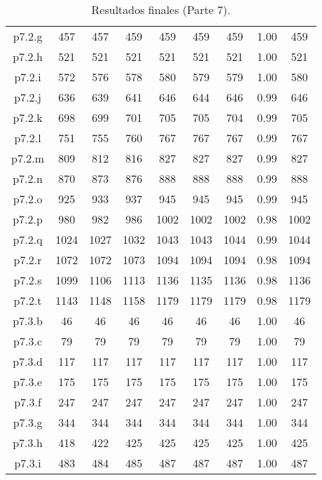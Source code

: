 \begin{table}
\begin{center}
\begin{tabular}{ |c|c|c|c|c|c|c|c|c| }
p7.2.g & 457 & 457 & 459 & 459 & 459 & 459 & 1.00 & 459  \\
p7.2.h & 521 & 521 & 521 & 521 & 521 & 521 & 1.00 & 521  \\
p7.2.i & 572 & 576 & 578 & 580 & 579 & 579 & 1.00 & 580  \\
p7.2.j & 636 & 639 & 641 & 646 & 644 & 646 & 0.99 & 646  \\
p7.2.k & 698 & 699 & 701 & 705 & 705 & 704 & 0.99 & 705  \\
p7.2.l & 751 & 755 & 760 & 767 & 767 & 767 & 0.99 & 767  \\
p7.2.m & 809 & 812 & 816 & 827 & 827 & 827 & 0.99 & 827  \\
p7.2.n & 870 & 873 & 876 & 888 & 888 & 888 & 0.99 & 888  \\
p7.2.o & 925 & 933 & 937 & 945 & 945 & 945 & 0.99 & 945  \\
p7.2.p & 980 & 982 & 986 & 1002 & 1002 & 1002 & 0.98 & 1002  \\
p7.2.q & 1024 & 1027 & 1032 & 1043 & 1043 & 1044 & 0.99 & 1044  \\
p7.2.r & 1072 & 1072 & 1073 & 1094 & 1094 & 1094 & 0.98 & 1094  \\
p7.2.s & 1099 & 1106 & 1113 & 1136 & 1135 & 1136 & 0.98 & 1136  \\
p7.2.t & 1143 & 1148 & 1158 & 1179 & 1179 & 1179 & 0.98 & 1179  \\
p7.3.b & 46 & 46 & 46 & 46 & 46 & 46 & 1.00 & 46  \\
p7.3.c & 79 & 79 & 79 & 79 & 79 & 79 & 1.00 & 79  \\
p7.3.d & 117 & 117 & 117 & 117 & 117 & 117 & 1.00 & 117  \\
p7.3.e & 175 & 175 & 175 & 175 & 175 & 175 & 1.00 & 175  \\
p7.3.f & 247 & 247 & 247 & 247 & 247 & 247 & 1.00 & 247  \\
p7.3.g & 344 & 344 & 344 & 344 & 344 & 344 & 1.00 & 344  \\
p7.3.h & 418 & 422 & 425 & 425 & 425 & 425 & 1.00 & 425  \\
p7.3.i & 483 & 484 & 485 & 487 & 487 & 487 & 1.00 & 487  \\
\hline
\end{tabular}
\end{center}
\caption{Resultados finales (Parte 7).}
\label{tab:resultadosFinales7}
\end{table}


